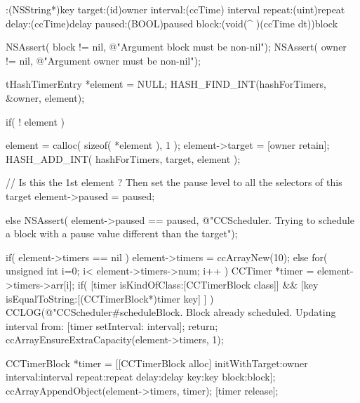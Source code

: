 \begin{DoxyCode}
                           :(NSString*)key target:(id)owner interval:(ccTime)
      interval repeat:(uint)repeat delay:(ccTime)delay paused:(BOOL)paused block:(void(^
      )(ccTime dt))block
{
        NSAssert( block != nil, @"Argument block must be non-nil");
        NSAssert( owner != nil, @"Argument owner must be non-nil");
        
        tHashTimerEntry *element = NULL;
        HASH_FIND_INT(hashForTimers, &owner, element);
        
        if( ! element ) {
                element = calloc( sizeof( *element ), 1 );
                element->target = [owner retain];
                HASH_ADD_INT( hashForTimers, target, element );
                
                // Is this the 1st element ? Then set the pause level to all
       the selectors of this target
                element->paused = paused;
                
        } else
                NSAssert( element->paused == paused, @"CCScheduler. Trying to
       schedule a block with a pause value different than the target");
        
        
        if( element->timers == nil )
                element->timers = ccArrayNew(10);
        else
        {
                for( unsigned int i=0; i< element->timers->num; i++ ) {
                        CCTimer *timer = element->timers->arr[i];
                        if( [timer isKindOfClass:[CCTimerBlock class]] && [key 
      isEqualToString:[(CCTimerBlock*)timer key] ] ) {
                                CCLOG(@"CCScheduler#scheduleBlock. Block
       already scheduled. Updating interval from: %
                                [timer setInterval: interval];
                                return;
                        }
                }
                ccArrayEnsureExtraCapacity(element->timers, 1);
        }
        
        CCTimerBlock *timer = [[CCTimerBlock alloc] initWithTarget:owner 
      interval:interval repeat:repeat delay:delay key:key block:block];
        ccArrayAppendObject(element->timers, timer);
        [timer release];
}
\end{DoxyCode}
